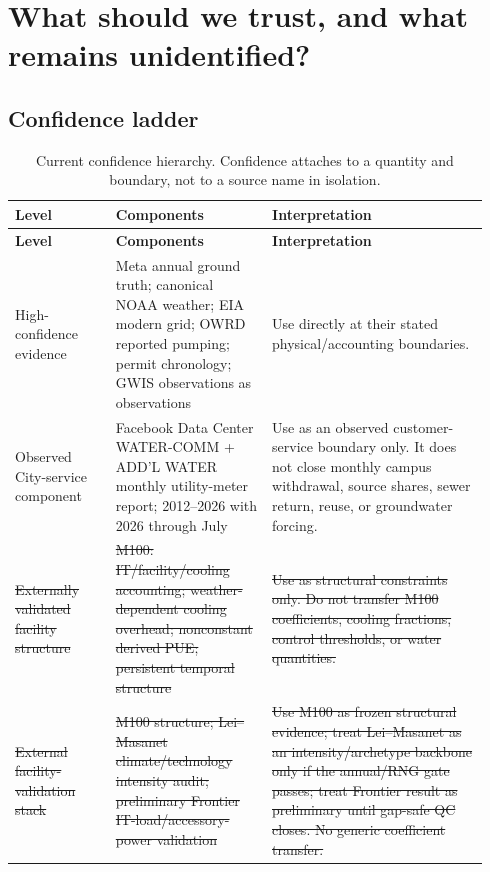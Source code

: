 \documentclass[11pt]{article}
\newcommand{\oldtxt}[1]{\textcolor{blue!70!black}{\sout{#1}}}
\newcommand{\latesttxt}[1]{\textcolor{purple!85!black}{#1}}
\begin{document}
\section{What should we trust, and what remains unidentified?}

\subsection*{Confidence ladder}

\begingroup
\small
\begin{longtable}{@{}p{0.20\linewidth}p{0.31\linewidth}p{0.43\linewidth}@{}}
\caption{\latesttxt{Current confidence hierarchy. Confidence attaches to a quantity and boundary, not to a source name in isolation.}}\\
\toprule
\textbf{Level} & \textbf{Components} & \textbf{Interpretation} \\
\midrule
\endfirsthead
\toprule
\textbf{Level} & \textbf{Components} & \textbf{Interpretation} \\
\midrule
\endhead
High-confidence evidence & Meta annual ground truth; canonical NOAA weather; EIA modern grid; OWRD reported pumping; permit chronology; GWIS observations as observations & Use directly at their stated physical/accounting boundaries. \\
\latesttxt{Observed City-service component} & \latesttxt{Facebook Data Center WATER-COMM + ADD'L WATER monthly utility-meter report; 2012--2026 with 2026 through July} & \latesttxt{Use as an observed customer-service boundary only. It does not close monthly campus withdrawal, source shares, sewer return, reuse, or groundwater forcing.} \\
\oldtxt{Externally validated facility structure} & \oldtxt{M100: IT/facility/cooling accounting; weather-dependent cooling overhead; nonconstant derived PUE; persistent temporal structure} & \oldtxt{Use as structural constraints only. Do not transfer M100 coefficients, cooling fractions, control thresholds, or water quantities.} \\
\oldtxt{External facility-validation stack} & \oldtxt{M100 structure; Lei--Masanet climate/technology intensity audit; preliminary Frontier IT-load/accessory-power validation} & \oldtxt{Use M100 as frozen structural evidence; treat Lei--Masanet as an intensity/archetype backbone only if the annual/RNG gate passes; treat Frontier result as preliminary until gap-safe QC closes. No generic coefficient transfer.} \\

\end{longtable}
\end{document}
